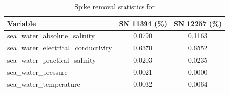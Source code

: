\begin{table}[h]
\centering
\caption{Spike removal statistics for \projectname{} \casenumber{}}
\label{tab:spike_stats}
\begin{tabular}{|l|c|c|}
\hline
Variable & SN 11394 (\%) & SN 12257 (\%) \\
\hline
sea\_water\_absolute\_salinity & 0.0790 & 0.1163 \\
sea\_water\_electrical\_conductivity & 0.6370 & 0.6552 \\
sea\_water\_practical\_salinity & 0.0203 & 0.0235 \\
sea\_water\_pressure & 0.0021 & 0.0000 \\
sea\_water\_temperature & 0.0032 & 0.0064 \\
\hline
\end{tabular}
\end{table}

